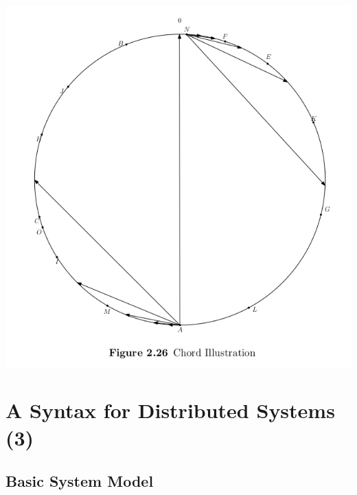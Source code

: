 \documentclass[11pt]{article}
\begin{document}
\begin{center}
\includegraphics[width=.9\linewidth]{Communication (Chapter 2)/screenshot_2018-08-27_18-25-49.png}
\end{center}

\section{A Syntax for Distributed Systems (3)}
\label{sec:org3ca03b8}
\subsection{Basic System Model}
\label{sec:org721bccf}
\end{document}
